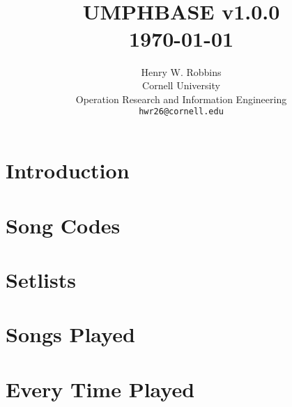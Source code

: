 \documentclass[8pt]{book}
\title{	\normalsize \textsc{} 					%
        \\[2.0cm]
        \HRule{2pt} \\ [0.5cm]
	\Huge \textbf{\uppercase{UMPHBASE} v1.0.0}	%
	\HRule{2pt} \\ [0.5cm]
	\large \today						%
}
\author{
	Henry W. Robbins\\
	Cornell University\\
	Operation Research and Information Engineering\\
        \texttt{hwr26@cornell.edu} \\
}
\makeatletter
\def\printtitle{%
    {\centering \@title\par}}
\def\printauthor{
    {\centering \large \@author}}
\makeatother
\begin{document}
\thispagestyle{empty}
\printtitle
\vfill
\printauthor
\newpage

\tableofcontents
\newpage

\chapter{Introduction}


\chapter{Song Codes}

\begin{multicols*}{3}
\setlength{\columnseprule}{0.4pt}
\noindent

\end{multicols*}


\chapter{Setlists}



\chapter{Songs Played}


\newpage


\chapter{Every Time Played}

\begin{multicols*}{4}
\setlength{\columnseprule}{0.4pt}
\begin{scriptsize}

\end{scriptsize}
\end{multicols*}


\end{document}

